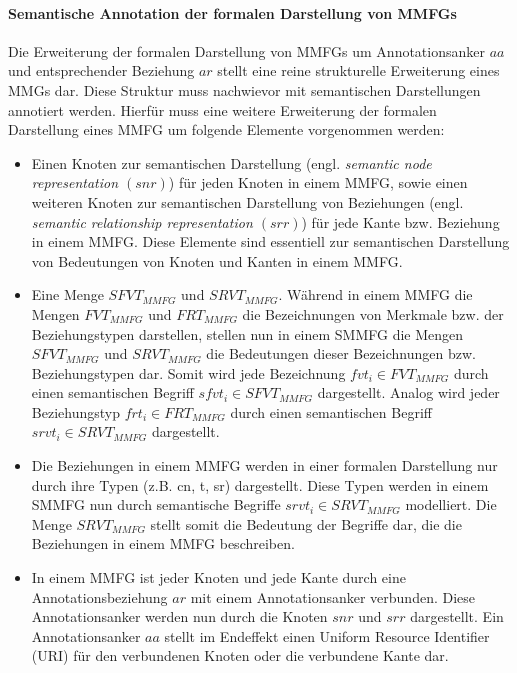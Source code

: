 \paragraph{Semantische Annotation der formalen Darstellung von MMFGs}
\label{sec2:sota:par:semantic-annot-formal-representation-smmfgs}
Die Erweiterung der formalen Darstellung von MMFGs um Annotationsanker $aa$ und entsprechender Beziehung $ar$ stellt eine reine strukturelle Erweiterung eines MMGs dar.
Diese Struktur muss nachwievor mit semantischen Darstellungen annotiert werden.
Hierfür muss eine weitere Erweiterung der formalen Darstellung eines MMFG um folgende Elemente vorgenommen werden:
\begin{itemize}
    \item Einen Knoten zur semantischen Darstellung (engl. \textit{semantic node representation $(snr)$}) für jeden Knoten in einem MMFG, sowie einen weiteren Knoten zur semantischen Darstellung von Beziehungen (engl. \textit{semantic relationship representation $(srr)$}) für jede Kante bzw. Beziehung in einem MMFG.
    Diese Elemente sind essentiell zur semantischen Darstellung von Bedeutungen von Knoten und Kanten in einem MMFG.
    \item Eine Menge $SFVT_{MMFG}$ und $SRVT_{MMFG}$.
    Während in einem MMFG die Mengen $FVT_{MMFG}$ und $FRT_{MMFG}$ die Bezeichnungen von Merkmale bzw. der Beziehungstypen darstellen, stellen nun in einem SMMFG die Mengen $SFVT_{MMFG}$ und $SRVT_{MMFG}$ die Bedeutungen dieser Bezeichnungen bzw. Beziehungstypen dar.
    Somit wird jede Bezeichnung $fvt_i \in FVT_{MMFG}$ durch einen semantischen Begriff $sfvt_i \in SFVT_{MMFG}$ dargestellt.
    Analog wird jeder Beziehungstyp $frt_i \in FRT_{MMFG}$ durch einen semantischen Begriff $srvt_i \in SRVT_{MMFG}$ dargestellt.
    \item Die Beziehungen in einem MMFG werden in einer formalen Darstellung nur durch ihre Typen (z.B. cn, t, sr) dargestellt.
    Diese Typen werden in einem SMMFG nun durch semantische Begriffe $srvt_i \in SRVT_{MMFG}$ modelliert. 
    Die Menge $SRVT_{MMFG}$ stellt somit die Bedeutung der Begriffe dar, die die Beziehungen in einem MMFG beschreiben.
    \item In einem MMFG ist jeder Knoten und jede Kante durch eine Annotationsbeziehung $ar$ mit einem Annotationsanker verbunden.
    Diese Annotationsanker werden nun durch die Knoten $snr$ und $srr$ dargestellt.
    Ein Annotationsanker $aa$ stellt im Endeffekt einen Uniform Resource Identifier (URI) 
    für den verbundenen Knoten oder die verbundene Kante dar.

\end{itemize}
